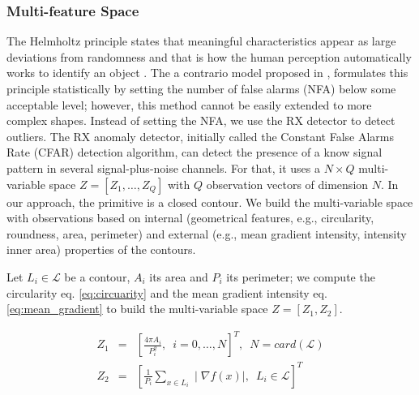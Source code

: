 \subsubsection{Multi-feature Space}\label{subsec:multispace}
The Helmholtz principle states that meaningful characteristics appear as large deviations from randomness and that is how the human perception automatically works to identify an object \citep{Attneave:PR:1954}. The a contrario model proposed in \citep{Desolneux.Moisan.ea:Gestalt:2008}, formulates this principle statistically by setting the number of false alarms (NFA) below some acceptable level; however, this method cannot be easily extended to more complex shapes. Instead of setting the NFA, we use the RX detector \citep{Reed.Yu:TASSP:1990} to detect outliers. The RX anomaly detector, initially called the Constant False Alarms Rate (CFAR) detection algorithm, can detect the presence of a know signal pattern in several signal-plus-noise channels. For that, it uses a $N\times Q$ multi-variable space $Z=[Z_{1}, \ldots, Z_{Q}]$ with $Q$  observation vectors of dimension $N$. In our approach, the primitive is a closed contour. We build the multi-variable space with observations based on internal (geometrical features, e.g., circularity, roundness, area, perimeter) and external (e.g., mean gradient intensity,  intensity inner area) properties of the contours.

Let $L_{i} \in \mathcal{L}$ be a contour, $A_{i}$ its area and $P_{i}$ its perimeter; we compute the circularity eq. \eqref{eq:circuarity} and the mean gradient intensity eq. \eqref{eq:mean_gradient} to build the multi-variable space $Z=[Z_{1}, Z_{2}]$. 

\begin{eqnarray}
Z_{1}&=&\left[\frac{4\pi A_{i}}{P_{i}^2}, \enspace i=0, \ldots, N\right]^T,  \enspace N = card(\mathcal{L}) \label{eq:circuarity}  \\ 
Z_{2}&=&\left[\frac{1}{P_{i}}\sum\limits_{x \in L_{i}} \mid\nabla f(x) \mid, \enspace L_{i} \in \mathcal{L}\right]^T  \label{eq:mean_gradient}
\end{eqnarray}

